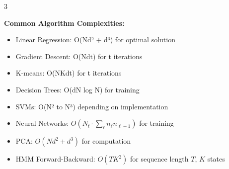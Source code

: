 \documentclass[10pt,landscape]{article}
\begin{document}
\begin{multicols}{3}
\begin{tcolorbox}[breakable, title=Time Complexity Analysis, colback=white,boxsep=1pt,left=1pt,right=1pt,top=1pt,bottom=1pt]
\textbf{Common Algorithm Complexities:}
\begin{itemize}[leftmargin=*,noitemsep,topsep=0pt]
    \item Linear Regression: O(Nd² + d³) for optimal solution
    \item Gradient Descent: O(Ndt) for t iterations
    \item K-means: O(NKdt) for t iterations
    \item Decision Trees: O(dN log N) for training
    \item SVMs: O(N² to N³) depending on implementation
    \item Neural Networks: $O(N_t \cdot \sum_{\ell} n_{\ell} n_{\ell-1})$ for training
    \item PCA: $O(Nd^2 + d^3)$ for computation
    \item HMM Forward-Backward: $O(TK^2)$ for sequence length $T$, $K$ states
\end{itemize}
\end{tcolorbox}

\end{multicols}
\end{document}
